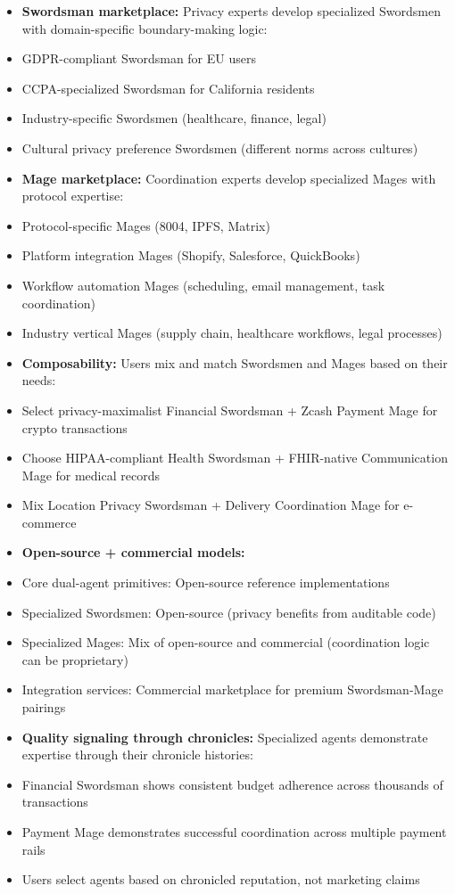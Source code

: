 \documentclass[
]{article}
\begin{document}
\begin{itemize}
\item
  \textbf{Swordsman marketplace:} Privacy experts develop specialized
  Swordsmen with domain-specific boundary-making logic:
\item
  GDPR-compliant Swordsman for EU users
\item
  CCPA-specialized Swordsman for California residents
\item
  Industry-specific Swordsmen (healthcare, finance, legal)
\item
  Cultural privacy preference Swordsmen (different norms across
  cultures)
\item
  \textbf{Mage marketplace:} Coordination experts develop specialized
  Mages with protocol expertise:
\item
  Protocol-specific Mages (8004, IPFS, Matrix)
\item
  Platform integration Mages (Shopify, Salesforce, QuickBooks)
\item
  Workflow automation Mages (scheduling, email management, task
  coordination)
\item
  Industry vertical Mages (supply chain, healthcare workflows, legal
  processes)
\item
  \textbf{Composability:} Users mix and match Swordsmen and Mages based
  on their needs:
\item
  Select privacy-maximalist Financial Swordsman + Zcash Payment Mage for
  crypto transactions
\item
  Choose HIPAA-compliant Health Swordsman + FHIR-native Communication
  Mage for medical records
\item
  Mix Location Privacy Swordsman + Delivery Coordination Mage for
  e-commerce
\item
  \textbf{Open-source + commercial models:}
\item
  Core dual-agent primitives: Open-source reference implementations
\item
  Specialized Swordsmen: Open-source (privacy benefits from auditable
  code)
\item
  Specialized Mages: Mix of open-source and commercial (coordination
  logic can be proprietary)
\item
  Integration services: Commercial marketplace for premium
  Swordsman-Mage pairings
\item
  \textbf{Quality signaling through chronicles:} Specialized agents
  demonstrate expertise through their chronicle histories:
\item
  Financial Swordsman shows consistent budget adherence across thousands
  of transactions
\item
  Payment Mage demonstrates successful coordination across multiple
  payment rails
\item
  Users select agents based on chronicled reputation, not marketing
  claims
\end{itemize}
\end{document}
